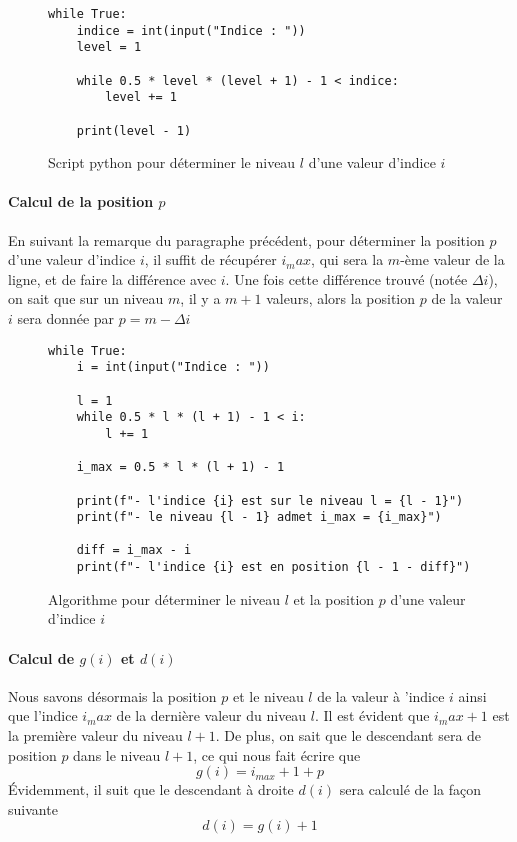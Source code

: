 \documentclass[a4paper,english,french]{article}
\begin{document}
\begin{figure}
\centering
\caption{Script python pour déterminer le niveau $l$ d'une valeur d'indice $i$}
\begin{verbatim}
while True:
    indice = int(input("Indice : "))
    level = 1

    while 0.5 * level * (level + 1) - 1 < indice:
        level += 1

    print(level - 1)
\end{verbatim}
\end{figure}

\paragraph*{Calcul de la position $p$} En suivant la remarque du paragraphe précédent, pour déterminer la position $p$ d'une valeur d'indice $i$, il suffit de récupérer $i_max$, qui sera la $m$-ème valeur de la ligne, et de faire la différence avec $i$. Une fois cette différence trouvé (notée $\Delta i$), on sait que sur un niveau $m$, il y a $m + 1$ valeurs, alors la position $p$ de la valeur $i$ sera donnée par $p = m - \Delta i$

\begin{figure}
\centering
\caption{Algorithme pour déterminer le niveau $l$ et la position $p$ d'une valeur d'indice $i$}
\begin{verbatim}
while True:
    i = int(input("Indice : "))

    l = 1
    while 0.5 * l * (l + 1) - 1 < i:
        l += 1

    i_max = 0.5 * l * (l + 1) - 1

    print(f"- l'indice {i} est sur le niveau l = {l - 1}")
    print(f"- le niveau {l - 1} admet i_max = {i_max}")

    diff = i_max - i
    print(f"- l'indice {i} est en position {l - 1 - diff}")
\end{verbatim}
\end{figure}

\paragraph*{Calcul de $g(i)$ et $d(i)$} Nous savons désormais la position $p$ et le niveau $l$ de la valeur à 'indice $i$ ainsi que l'indice $i_max$ de la dernière valeur du niveau $l$. Il est évident que $i_max + 1$ est la première valeur du niveau $l + 1$. De plus, on sait que le descendant sera de position $p$ dans le niveau $l + 1$, ce qui nous fait écrire que \[ g(i) = i_{max} + 1 + p \] Évidemment, il suit que le descendant à droite $d(i)$ sera calculé de la façon suivante \[ d(i) = g(i) + 1 \]
\end{document}
